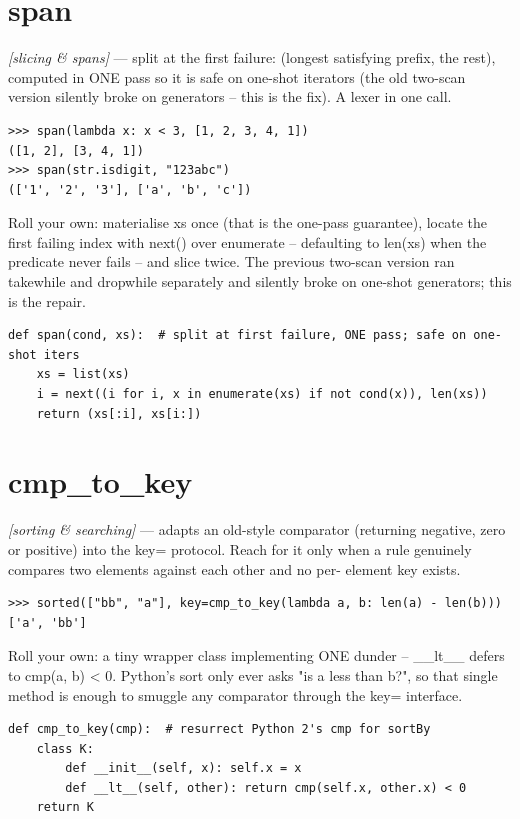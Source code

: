 \documentclass[11pt,letterpaper]{book}
\begin{document}
\section{span}
\noindent\textit{[slicing \& spans]} --- split at the first failure: (longest satisfying prefix, the rest), computed in ONE pass so it is safe on one-shot iterators (the old two-scan version silently broke on generators -- this is the fix). A lexer in one call.
\begin{lstlisting}[style=spec]
>>> span(lambda x: x < 3, [1, 2, 3, 4, 1])
([1, 2], [3, 4, 1])
>>> span(str.isdigit, "123abc")
(['1', '2', '3'], ['a', 'b', 'c'])
\end{lstlisting}

Roll your own: materialise xs once (that is the one-pass guarantee), locate the first failing index with next() over enumerate -- defaulting to len(xs) when the predicate never fails -- and slice twice. The previous two-scan version ran takewhile and dropwhile separately and silently broke on one-shot generators; this is the repair.

\begin{lstlisting}[style=code]
def span(cond, xs):  # split at first failure, ONE pass; safe on one-shot iters
    xs = list(xs)
    i = next((i for i, x in enumerate(xs) if not cond(x)), len(xs))
    return (xs[:i], xs[i:])
\end{lstlisting}

\section{cmp\_to\_key}
\noindent\textit{[sorting \& searching]} --- adapts an old-style comparator (returning negative, zero or positive) into the key= protocol. Reach for it only when a rule genuinely compares two elements against each other and no per- element key exists.
\begin{lstlisting}[style=spec]
>>> sorted(["bb", "a"], key=cmp_to_key(lambda a, b: len(a) - len(b)))
['a', 'bb']
\end{lstlisting}

Roll your own: a tiny wrapper class implementing ONE dunder -- \_\_lt\_\_ defers to cmp(a, b) < 0. Python's sort only ever asks "is a less than b?", so that single method is enough to smuggle any comparator through the key= interface.

\begin{lstlisting}[style=code]
def cmp_to_key(cmp):  # resurrect Python 2's cmp for sortBy
    class K:
        def __init__(self, x): self.x = x
        def __lt__(self, other): return cmp(self.x, other.x) < 0
    return K
\end{lstlisting}
\end{document}
